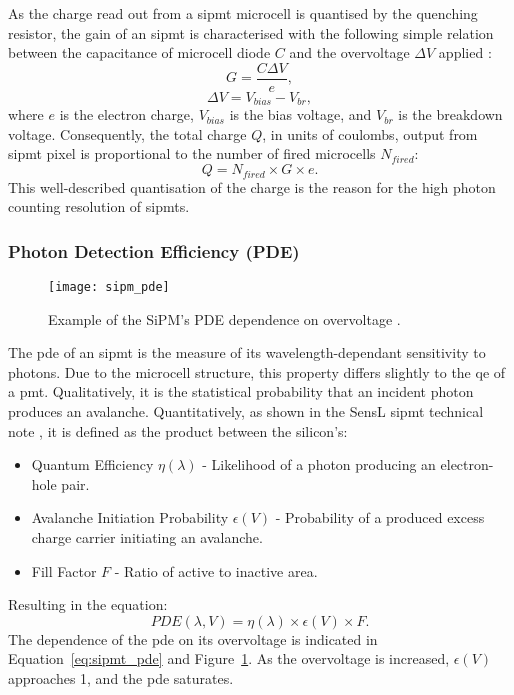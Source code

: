 As the charge read out from a \gls{sipmt} microcell is quantised by the quenching resistor, the gain of an \gls{sipmt} is characterised with the following simple relation between the capacitance of microcell diode $C$ and the overvoltage $\Delta V$ applied \cite{SensL2011}:
\begin{equation} \label{eq:sipmt_gain}
G = \frac{C \Delta V}{e},
\end{equation}
\begin{equation} \label{eq:sipmt_voltage}
\Delta V = V_{bias} - V_{br},
\end{equation}
where $e$ is the electron charge, $V_{bias}$ is the bias voltage, and $V_{br}$ is the breakdown voltage. Consequently, the total charge $Q$, in units of coulombs, output from \gls{sipmt} pixel is proportional to the number of fired microcells $N_{fired}$:
\begin{equation} \label{eq:sipmt_charge}
Q = N_{fired} \times G \times e.
\end{equation}
This well-described quantisation of the charge is the reason for the high photon counting resolution of \glspl{sipmt}.

\subsubsection{Photon Detection Efficiency (PDE)}

\begin{figure}
	\centering
    \texttt{[image: sipm\_pde]} 
	\caption[Example of the SiPM's PDE dependence on overvoltage.]{Example of the SiPM's PDE dependence on overvoltage \cite{SensL2011}.}
	\label{fig:sipm_pde}
\end{figure}

The \gls{pde} of an \gls{sipmt} is the measure of its wavelength-dependant sensitivity to photons. Due to the microcell structure, this property differs slightly to the \gls{qe} of a \gls{pmt}. Qualitatively, it is the statistical probability that an incident photon produces an avalanche. Quantitatively, as shown in the SensL \gls{sipmt} technical note \cite{SensL2011}, it is defined as the product between the silicon's:
\begin{itemize}
\item Quantum Efficiency $\eta(\lambda)$ - Likelihood of a photon producing an electron-hole pair. 
\item Avalanche Initiation Probability $\epsilon(V)$ - Probability of a produced excess charge carrier initiating an avalanche.
\item Fill Factor $F$ - Ratio of active to inactive area.
\end{itemize}
Resulting in the equation:
\begin{equation} \label{eq:sipmt_pde}
PDE(\lambda, V) = \eta(\lambda) \times \epsilon(V) \times F.
\end{equation}
The dependence of the \gls{pde} on its overvoltage is indicated in Equation~\ref{eq:sipmt_pde} and Figure~\ref{fig:sipm_pde}. As the overvoltage is increased, $\epsilon(V)$ approaches 1, and the \gls{pde} saturates.

